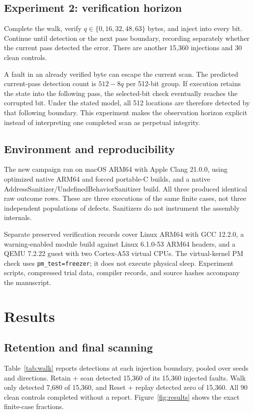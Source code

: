 \documentclass[10pt,twocolumn,letterpaper]{article}
\newcommand{\code}[1]{\texttt{#1}}
\begin{document}
\subsection{Experiment 2: verification horizon}
Complete the walk, verify $q\in\{0,16,32,48,63\}$ bytes, and inject into every bit. Continue until detection or the next pass boundary, recording separately whether the current pass detected the error. There are another 15,360 injections and 30 clean controls.

A fault in an already verified byte can escape the current scan. The predicted current-pass detection count is $512-8q$ per 512-bit group. If execution retains the state into the following pass, the selected-bit check eventually reaches the corrupted bit. Under the stated model, all 512 locations are therefore detected by that following boundary. This experiment makes the observation horizon explicit instead of interpreting one completed scan as perpetual integrity.

\subsection{Environment and reproducibility}
The new campaign ran on macOS ARM64 with Apple Clang 21.0.0, using optimized native ARM64 and forced portable-C builds, and a native AddressSanitizer/UndefinedBehaviorSanitizer build. All three produced identical raw outcome rows. These are three executions of the same finite cases, not three independent populations of defects. Sanitizers do not instrument the assembly internals.

Separate preserved verification records cover Linux ARM64 with GCC 12.2.0, a warning-enabled module build against Linux 6.1.0-53 ARM64 headers, and a QEMU 7.2.22 guest with two Cortex-A53 virtual CPUs. The virtual-kernel PM check uses \code{pm\_test=freezer}; it does not execute physical sleep. Experiment scripts, compressed trial data, compiler records, and source hashes accompany the manuscript.

\section{Results}
\subsection{Retention and final scanning}
Table~\ref{tab:walk} reports detections at each injection boundary, pooled over seeds and directions. Retain + scan detected 15,360 of its 15,360 injected faults. Walk only detected 7,680 of 15,360, and Reset + replay detected zero of 15,360. All 90 clean controls completed without a report. Figure~\ref{fig:results} shows the exact finite-case fractions.
\end{document}
